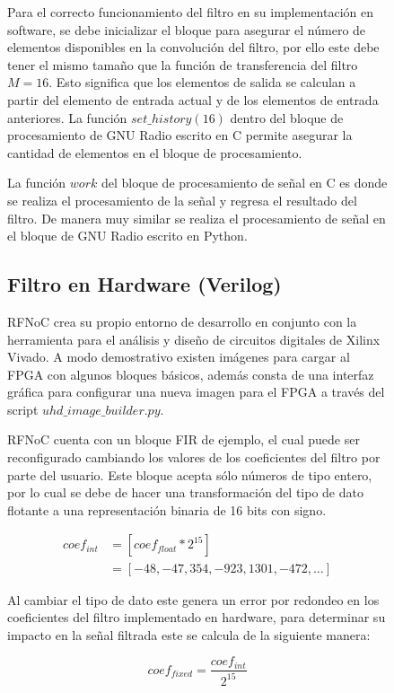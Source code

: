 \documentclass[12pt]{difu100cia} %
\begin{document}
\begin{figure}[!ht]
Para el correcto funcionamiento del filtro en su implementación en software, se debe inicializar el bloque para asegurar el número de elementos disponibles en la convolución del filtro, por ello este debe tener el mismo tamaño que la función de transferencia del filtro $M=16$. Esto significa que los elementos de salida se calculan a partir del elemento de entrada actual y de los elementos de entrada anteriores. La función $set\_history(16)$ dentro del bloque de procesamiento de GNU Radio escrito en C permite asegurar la cantidad de elementos en el bloque de procesamiento.

La función $work$ del bloque de procesamiento de señal en C es donde se realiza el procesamiento de la señal y regresa el resultado del filtro. De manera muy similar se realiza el procesamiento de señal en el bloque de GNU Radio escrito en Python.

\subsection{Filtro en Hardware (Verilog)}

RFNoC crea su propio entorno de desarrollo en conjunto con la herramienta para el análisis y diseño de circuitos digitales de Xilinx Vivado. A modo demostrativo existen imágenes para cargar al FPGA con algunos bloques básicos, además consta de una interfaz gráfica para configurar una nueva imagen para el FPGA a través del script $uhd\_image\_builder.py$.  

RFNoC cuenta con un bloque FIR de ejemplo, el cual puede ser reconfigurado cambiando los valores de los coeficientes del filtro por parte del usuario. Este bloque acepta sólo números de tipo entero, por lo cual se debe de hacer una transformación del tipo de dato flotante a una representación binaria de 16 bits con signo.

\begin{equation}
\label{ec_coeffs_int} 
\begin{split}
coef_{int} & =[coef_{float}*2^{15}] \\
&  = [-48,-47,354,-923,1301,-472, \ldots]
\end{split}
\end{equation}

Al cambiar el tipo de dato este genera un error por redondeo en los coeficientes del filtro implementado en hardware, para determinar su impacto en la señal filtrada este se calcula de la siguiente manera:

\begin{equation}
    coef_{fixed}= \frac{coef_{int}}{2^{15}}
\label{ec_coeffs_fixed}  
\end{equation}


\end{figure}
\end{document}
